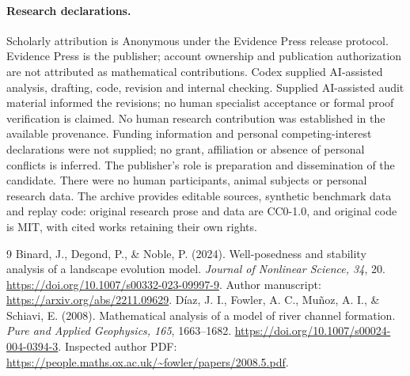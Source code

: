 \documentclass[11pt,a4paper]{article}
\theoremstyle{remark}\newtheorem{remark}[theorem]{Remark}
\begin{document}
\paragraph{Research declarations.}
Scholarly attribution is Anonymous under the Evidence Press release protocol.
Evidence Press is the publisher; account ownership and publication authorization
are not attributed as mathematical contributions. Codex supplied AI-assisted
analysis, drafting, code, revision and internal checking. Supplied AI-assisted
audit material informed the revisions; no human specialist acceptance or
formal proof verification is claimed. No human research contribution was
established in the available provenance. Funding information and personal
competing-interest declarations were not supplied; no grant, affiliation or
absence of personal conflicts is inferred. The publisher's role is preparation
and dissemination of the candidate. There were no human participants, animal
subjects or personal research data. The archive provides editable sources,
synthetic benchmark data and replay code: original research prose and data are
CC0-1.0, and original code is MIT, with cited works retaining their own rights.

\begin{thebibliography}{9}
 Binard, J., Degond, P., \& Noble, P. (2024). Well-posedness and stability analysis of a landscape evolution model. \emph{Journal of Nonlinear Science, 34}, 20. \url{https://doi.org/10.1007/s00332-023-09997-9}. Author manuscript: \url{https://arxiv.org/abs/2211.09629}.
 D\'iaz, J. I., Fowler, A. C., Mu\~noz, A. I., \& Schiavi, E. (2008). Mathematical analysis of a model of river channel formation. \emph{Pure and Applied Geophysics, 165}, 1663--1682. \url{https://doi.org/10.1007/s00024-004-0394-3}. Inspected author PDF: \url{https://people.maths.ox.ac.uk/~fowler/papers/2008.5.pdf}.
\end{thebibliography}
\end{document}
